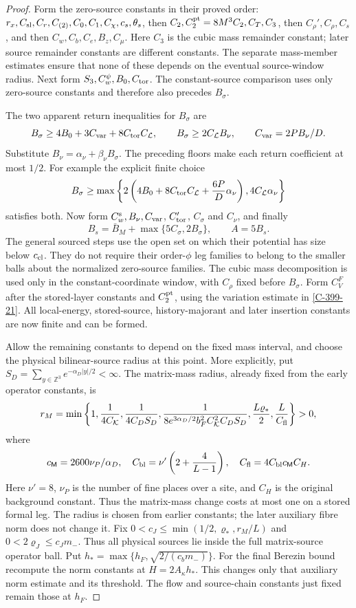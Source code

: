\documentclass[11pt,letterpaper,reqno]{amsart}
\theoremstyle{definition}
\theoremstyle{remark}
\begin{document}
\begin{proof}
Form the zero-source constants in their proved order:
$r_x,C_{\rm sl},C_r,C_{(2)},C_0,C_1,C_\chi,c_s,\theta_s$,
then $C_2,C_2^{\rm pt}=8M^3C_2,C_T,C_3$, then
$C_\rho',C_\rho,C_s$, and then
$C_w,C_b,C_e,B_z,C_\mu$. Here $C_3$ is the cubic mass
remainder constant; later source remainder constants are
different constants. The separate mass-member estimates
ensure that none of these depends on the eventual source-window
radius. Next form $S_3,C_w^\psi,B_0,C_{\rm tor}$.
The constant-source comparison uses only zero-source
constants and therefore also precedes $B_\sigma$.

The two apparent return inequalities for $B_\sigma$ are
\[
 B_\sigma\ge4B_0+3C_{\rm var}+8C_{\rm tor}C_{\mathcal L},
 \qquad B_\sigma\ge2C_{\mathcal L}B_\nu,
 \qquad C_{\rm var}=2PB_\nu/D.
\]
Substitute $B_\nu=\alpha_\nu+\beta_\nu B_\sigma$.
The preceding floors make each return coefficient at most
$1/2$. For example the explicit finite choice
\[
 B_\sigma\ge\max\left\{
 2\left(4B_0+8C_{\rm tor}C_{\mathcal L}
                         +\frac{6P}D\alpha_\nu\right),
 4C_{\mathcal L}\alpha_\nu\right\}
\]
satisfies both. Now form $C_w^{\rm s},B_\nu,C_{\rm var}$,
$C_{\rm tor}'$, $C_\sigma$ and $C_\nu$, and finally
\[
 B_s=\bar B_M+\max\{5C_\sigma,2B_\sigma\},\qquad A=5B_s.
\]
The general sourced steps use the open set on which their
potential has size below $c_{\rm cl}$. They do not require
their order-$\phi$ leg families to belong to the smaller
balls about the normalized zero-source families. The cubic
mass decomposition is used only in the constant-coordinate
window, with $C_\rho$ fixed before $B_\sigma$.
Form $C_V^F$ after the stored-layer constants and
$C_2^{\rm pt}$, using the variation estimate in
\cref{C-399-21}. All local-energy, stored-source,
history-majorant and later insertion constants are now
finite and can be formed.

Allow the remaining constants to depend on the fixed mass interval,
and choose the physical bilinear-source radius at this point.
More explicitly, put
$S_D=\sum_{y\in\mathbb Z^3}e^{-\alpha_D|y|/2}<\infty$.
The matrix-mass radius, already fixed from the early operator
constants, is
\[
 r_M=\min\left\{1,\frac1{4C_{\mathcal K}},\frac1{4C_DS_D},
 \frac1{8e^{3\alpha_D/2}b_F^2C_{\mathcal K}^2C_DS_D},
 \frac{L\varrho_*}2,\frac L{C_{\rm fl}}\right\}>0,
\]
where
\[
 c_{\mathsf M}=2600\nu_P/\alpha_D,\quad
 C_{\rm bl}=\nu'\left(2+\frac4{L-1}\right),\quad
 C_{\rm fl}=4C_{\rm bl}c_{\mathsf M}C_H.
\]
Here $\nu'=8$, $\nu_P$ is the number of fine places over a
site, and $C_H$ is the original background constant.
Thus the matrix-mass change costs at most one on a stored
formal leg. The radius is chosen from earlier constants;
the later auxiliary fibre norm does not change it.
Fix $0<c_J\le\min(1/2,\varrho_*,r_M/L)$ and
$0<2\varrho_J\le c_Jm_-$. Thus all physical sources lie
inside the full matrix-source operator ball. Put
$h_*=\max\{h_F,\sqrt{2/(c_bm_-)}\}$.
For the final Berezin bound recompute the norm constants
at $H=2A_\kappa h_*$. This changes only that auxiliary norm
estimate and its threshold. The flow and source-chain
constants just fixed remain those at $h_F$.


\end{proof}
\end{document}
